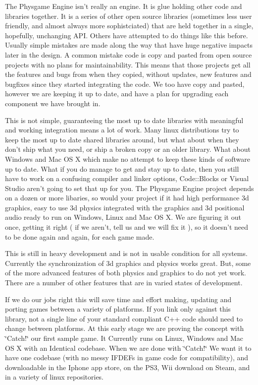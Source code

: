 The Physgame Engine isn't really an engine. It is glue holding other code and libraries together. It is a series of other open source libraries (sometimes less user friendly, and almost always more sophistciated) that are held together in a single, hopefully, unchanging API. Others have attempted to do things like this before. Usually simple mistakes are made along the way that have huge negative impacts later in the design. A common mistake code is copy and pasted from open source projects with no plans for maintainability. This means that those projects get all the features and bugs from when they copied, without updates, new features and bugfixes since they started integrating the code. We too have copy and pasted, however we are keeping it up to date, and have a plan for upgrading each component we have brought in.

This is not simple, guaranteeing the most up to date libraries with meaningful and working integration means a lot of work. Many linux distributions try to keep the most up to date shared libraries around, but what about when they don't ship what you need, or ship a broken copy or an older library. What about Windows and Mac OS X which make no attempt to keep these kinds of software up to date. What if you do manage to get and stay up to date, then you still have to work on a confusing compiler and linker options, Code::Blocks or Visual Studio aren't going to set that up for you. The Physgame Engine project depends on a dozen or more libaries, so would your project if it had high performance 3d graphics, easy to use 3d physics integrated with the graphics and 3d positional audio ready to run on Windows, Linux and Mac OS X. We are figuring it out once, getting it right ( if we aren't, tell us and we will fix it ), so it doesn't need to be done again and again, for each game made.

This is still in heavy development and is not in usable condition for all systems. Currently the synchronization of 3d graphics and physics works great. But, some of the more advanced features of both physics and graphics to do not yet work. There are a number of other features that are in varied states of development.

If we do our jobs right this will save time and effort making, updating and porting games between a variety of platforms. If you link only against this library, not a single line of your standard compliant C++ code should need to change between platforms. At this early stage we are proving the concept with \char`\"{}Catch!\char`\"{} our first sample game. It Currently runs on Linux, Windows and Mac OS X with an Identical codebase. When we are done with \char`\"{}Catch!\char`\"{} We want it to have one codebase (with no messy IFDEFs in game code for compatibility), and downloadable in the Iphone app store, on the PS3, Wii download on Steam, and in a variety of linux repositories.

